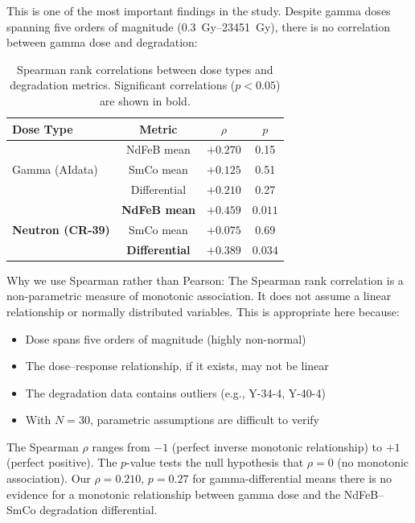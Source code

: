 \documentclass[11pt,letterpaper]{article}
\begin{document}
This is one of the most important findings in the study. Despite gamma doses
spanning five orders of magnitude (\SIrange{0.3}{23451}{Gy}), there is
no correlation between gamma dose and degradation:

\begin{table}[H]
\centering
\caption{Spearman rank correlations between dose types and degradation metrics.
Significant correlations ($p < 0.05$) are shown in bold.}
\label{tab:correlations}
\begin{tabular}{@{}lccc@{}}
\toprule
\textbf{Dose Type} & \textbf{Metric} & $\rho$ & $p$ \\
\midrule
\multirow{3}{*}{Gamma (AIdata)} & NdFeB mean & $+0.270$ & 0.15 \\
 & SmCo mean & $+0.125$ & 0.51 \\
 & Differential & $+0.210$ & 0.27 \\
\midrule
\multirow{3}{*}{\textbf{Neutron (CR-39)}} & \textbf{NdFeB mean} & $\mathbf{+0.459}$ & $\mathbf{0.011}$ \\
 & SmCo mean & $+0.075$ & 0.69 \\
 & \textbf{Differential} & $\mathbf{+0.389}$ & $\mathbf{0.034}$ \\
\bottomrule
\end{tabular}
\end{table}

Why we use Spearman rather than Pearson: The Spearman rank correlation
is a non-parametric measure of monotonic association. It does not assume a
linear relationship or normally distributed variables. This is appropriate here
because:
\begin{itemize}
    \item Dose spans five orders of magnitude (highly non-normal)
    \item The dose--response relationship, if it exists, may not be linear
    \item The degradation data contains outliers (e.g., Y-34-4, Y-40-4)
    \item With $N = 30$, parametric assumptions are difficult to verify
\end{itemize}

The Spearman $\rho$ ranges from $-1$ (perfect inverse monotonic relationship)
to $+1$ (perfect positive). The $p$-value tests the null hypothesis that $\rho
= 0$ (no monotonic association). Our $\rho = 0.210$, $p = 0.27$ for
gamma-differential means there is no evidence for a monotonic relationship
between gamma dose and the NdFeB--SmCo degradation differential.
\end{document}
